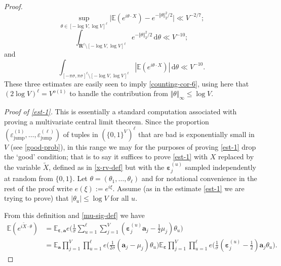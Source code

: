 \documentclass[11pt,reqno]{amsart}
\numberwithin{equation}{section}
\theoremstyle{definition}
\theoremstyle{remark}
\newcommand{\mb}{\mathbb}
\newcommand{\mbf}{\mathbf}
\newcommand{\eps}{\varepsilon}
\def\boldeps{\boldsymbol\eps}
\renewcommand{\le}{\leqslant}
\newcommand\jump{\operatorname{jump}}
\begin{document}
\begin{proof}
\begin{equation}\label{est-1} \sup_{\theta \in [-\log V, \log V]^{\ell}} \big|\mb{E}(e^{i \theta \cdot X}) - e^{-\Vert \theta \Vert_2^2/2} \big|  \ll V^{-2/7}  ;\end{equation}
\begin{equation}\label{est-2} \int_{\mbf{R}^{\ell} \setminus [-\log V, \log V]^{\ell} } e^{-\Vert \theta \Vert_2^2/2} \, \mathrm{d}\theta  \ll V^{-10};\end{equation} and
\begin{equation}\label{est-3} \int_{[-\pi \sigma, \pi \sigma]^{\ell} \setminus [-\log V, \log V]^{\ell} } |\mb{E}(e^{i \theta \cdot X})|  \, \mathrm{d}\theta  \ll V^{-10}.\end{equation}
These three estimates are easily seen to imply \cref{counting-cor-6}, using here that $(2\log V)^{\ell} = V^{o(1)}$ to handle the contribution from $\Vert \theta \Vert_{\infty} \le \log V$.\vspace*{8pt}

\emph{Proof of \cref{est-1}.} This is essentially a standard computation associated with proving a multivariate central limit theorem. Since the proportion $(\eps_{\jump}^{(1)}, \dots ,\eps_{\jump}^{(\ell)})$ of tuples in $(\{0,1\}^V)^{\ell}$ that are bad is exponentially small in $V$ (see \cref{good-prob}), in this range we may for the purposes of proving \cref{est-1} drop the `good' condition; that is to say it suffices to prove \cref{est-1} with $X$ replaced by the variable $\tilde X$, defined as in \cref{x-rv-def} but with the $\boldeps_{j}^{(u)}$ sampled independently at random from $\{0,1\}$. Let $\theta = (\theta_1,\dots, \theta_{\ell})$ and for notational convenience in the rest of the proof write $e(\xi) := e^{i\xi}$. Assume (as in the estimate \cref{est-1} we are trying to prove) that $|\theta_u| \le \log V$ for all $u$. 

From this definition and \cref{mu-sig-def} we have
\begin{align}\nonumber \mb{E}(e^{i \tilde X \cdot \theta}) &  = \mb{E}_{\boldeps,\mbf{a}} e\big( \frac{1}{\sigma} \sum_{u = 1}^{\ell} \sum_{j = 1}^V (\boldeps_j^{(u)} \mbf{a}_j - \tfrac{1}{2}\mu_j)\theta_u \big) \\ &  = \mb{E}_{\mbf{a}}\prod_{j=1}^{V}\prod_{u = 1}^{\ell}e\big( \frac{1}{2\sigma}  (\mbf{a}_j -\mu_j) \theta_u \big)\mb{E}_{\boldeps} \prod_{j=1}^{V}\prod_{u = 1}^{\ell}e\big( \frac{1}{\sigma}  (\boldeps_j^{(u)}-\tfrac{1}{2}) \mbf{a}_j \theta_u \big). \label{first-328}\end{align}


\end{proof}
\end{document}
